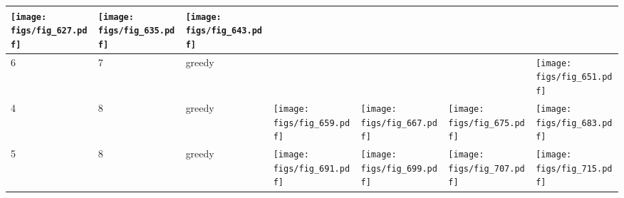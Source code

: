 \documentclass[oneside,canadian,landscape]{article}
\begin{document}
\begin{center}
\begin{longtable}{|l|l|l||l|l|l|l|}
\begin{minipage}{3.5cm}
\texttt{[image: figs/fig\_627.pdf]}
\end{minipage}
&\begin{minipage}{3.5cm}
\texttt{[image: figs/fig\_635.pdf]}
\end{minipage}
&\begin{minipage}{3.5cm}
\texttt{[image: figs/fig\_643.pdf]}
\end{minipage}
\\ \hline
6&7&greedy&&&&\begin{minipage}{3.5cm}
\texttt{[image: figs/fig\_651.pdf]}
\end{minipage}
\\ \hline
4&8&greedy&\begin{minipage}{3.5cm}
\texttt{[image: figs/fig\_659.pdf]}
\end{minipage}
&\begin{minipage}{3.5cm}
\texttt{[image: figs/fig\_667.pdf]}
\end{minipage}
&\begin{minipage}{3.5cm}
\texttt{[image: figs/fig\_675.pdf]}
\end{minipage}
&\begin{minipage}{3.5cm}
\texttt{[image: figs/fig\_683.pdf]}
\end{minipage}
\\ \hline
5&8&greedy&\begin{minipage}{3.5cm}
\texttt{[image: figs/fig\_691.pdf]}
\end{minipage}
&\begin{minipage}{3.5cm}
\texttt{[image: figs/fig\_699.pdf]}
\end{minipage}
&\begin{minipage}{3.5cm}
\texttt{[image: figs/fig\_707.pdf]}
\end{minipage}
&\begin{minipage}{3.5cm}
\texttt{[image: figs/fig\_715.pdf]}
\end{minipage}
\\ \hline
\end{longtable}
\end{center}
\end{document}
